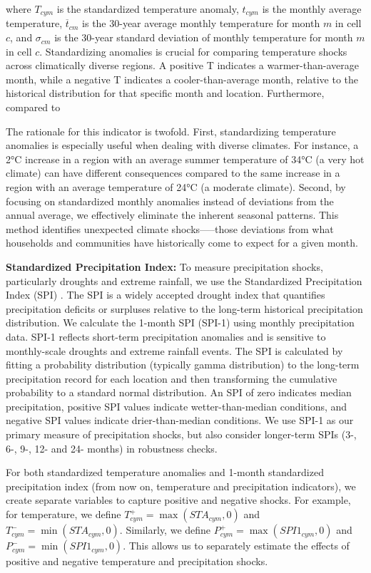 \documentclass[a4paper]{article}
\begin{document}
where \(T_{cym}\) is the standardized temperature anomaly, \(t_{cym}\) is the monthly average temperature, \(\overline{t}_{cm}\) is the 30-year average monthly temperature for month \(m\) in cell \(c\), and \(\sigma_{cm}\) is the 30-year standard deviation of monthly temperature for month \(m\) in cell \(c\).  Standardizing anomalies is crucial for comparing temperature shocks across climatically diverse regions.  A positive T indicates a warmer-than-average month, while a negative T indicates a cooler-than-average month, relative to the historical distribution for that specific month and location. Furthermore, compared to 

The rationale for this indicator is twofold. First, standardizing temperature anomalies is especially useful when dealing with diverse climates. For instance, a 2°C increase in a region with an average summer temperature of 34°C (a very hot climate) can have different consequences compared to the same increase in a region with an average temperature of 24°C (a moderate climate). Second, by focusing on standardized monthly anomalies instead of deviations from the annual average, we effectively eliminate the inherent seasonal patterns.  This method identifies unexpected climate shocks—--those deviations from what households and communities have historically come to expect for a given month.

\textbf{Standardized Precipitation Index:}  To measure precipitation shocks, particularly droughts and extreme rainfall, we use the Standardized Precipitation Index (SPI) \cite{mckee1993}.  The SPI is a widely accepted drought index that quantifies precipitation deficits or surpluses relative to the long-term historical precipitation distribution.  We calculate the 1-month SPI (SPI-1) using monthly precipitation data.  SPI-1 reflects short-term precipitation anomalies and is sensitive to monthly-scale droughts and extreme rainfall events.  The SPI is calculated by fitting a probability distribution (typically gamma distribution) to the long-term precipitation record for each location and then transforming the cumulative probability to a standard normal distribution.  An SPI of zero indicates median precipitation, positive SPI values indicate wetter-than-median conditions, and negative SPI values indicate drier-than-median conditions.  We use SPI-1 as our primary measure of precipitation shocks, but also consider longer-term SPIs (3-, 6-, 9-, 12- and 24- months) in robustness checks.

For both standardized temperature anomalies and 1-month standardized precipitation index (from now on, temperature and precipitation indicators), we create separate variables to capture positive and negative shocks.  For example, for temperature, we define \(T^+_{cym} = \max(STA_{cym}, 0)\) and \(T^-_{cym} = \min(STA_{cym}, 0)\).  Similarly, we define \(P^+_{cym} = \max(SPI1_{cym}, 0)\) and \(P^-_{cym} = \min(SPI1_{cym}, 0)\). This allows us to separately estimate the effects of positive and negative temperature and precipitation shocks.
\end{document}

